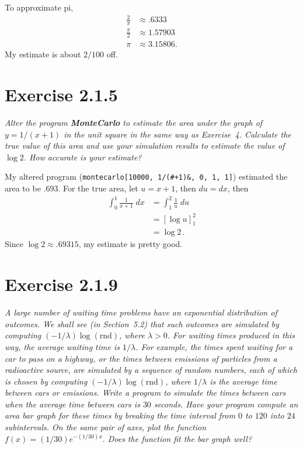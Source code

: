 \documentclass{tufte-handout}
\begin{document}
To approximate pi,
\begin{align*}
  \frac{2}{\pi} & \approx .6333 \\
  \frac{\pi}{2} & \approx 1.57903 \\
  \pi & \approx 3.15806.
\end{align*}
My estimate is about $2/100$ off.

\section{Exercise 2.1.5}

\textit{Alter the program \textbf{MonteCarlo} to estimate the area
  under the graph of $y = 1/(x+1)$ in the unit square in the same way
  as Exercise~4. Calculate the true value of this area and use your
  simulation results to estimate the value of $\log{2}$. How accurate
  is your estimate?}

\bigskip

My altered program (\lstinline$montecarlo[10000, 1/(#+1)&, 0, 1, 1]$)
estimated the area to be $.693$. For the true area, let $u = x +
1$, then $du = dx$, then
\begin{align*}
  \int_0^1 \frac{1}{x+1} \; dx &= \int_1^2 \frac{1}{u} \;
                                 du \\
                               &= \left[ \log{u} \right]_1^2 \\
                               &= \log{2} \, .
\end{align*}
Since $\log{2} \approx .69315$, my estimate is pretty good.

\section{Exercise 2.1.9}

\textit{A large number of waiting time problems have an exponential
  distribution of outcomes. We shall see (in Section~5.2) that such
  outcomes are simulated by computing
  $(-1/\lambda)\log{(\mathrm{rnd})}$, where $\lambda > 0$. For waiting
  times produced in this way, the average waiting time is
  $1/\lambda$. For example, the times spent waiting for a car to pass
  on a highway, or the times between emissions of particles from a
  radioactive source, are simulated by a sequence of random numbers,
  each of which is chosen by computing
  $(-1/\lambda)\log{(\mathrm{rnd})}$, where $1/\lambda$ is the average
  time between cars or emissions. Write a program to simulate the
  times between cars when the average time between cars is $30$
  seconds. Have your program compute an area bar graph for these times
  by breaking the time interval from $0$ to $120$ into $24$
  subintervals. On the same pair of axes, plot the function
  $f(x) = (1/30)e^{-(1/30)x}.$ Does the function fit the bar graph
  well?}
\end{document}
